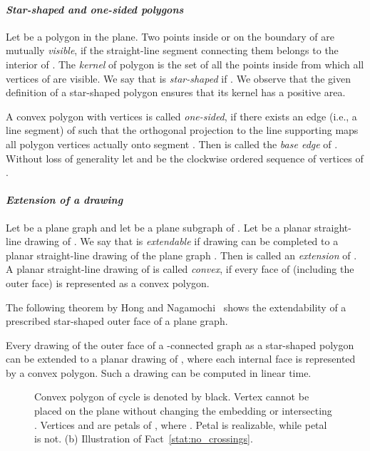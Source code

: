 \documentclass{llncs}
\begin{document}
\paragraph{\emph{\bf Star-shaped and one-sided polygons}}
Let  be a polygon in the plane.  Two points inside or on the boundary of  are mutually \emph{visible}, if the straight-line segment
connecting them belongs to the interior of . The \emph{kernel}  of polygon
 is the set of all the points inside  from which all vertices of
 are visible. We say that  is \emph{star-shaped} if . We observe that the given definition of a star-shaped polygon ensures that its kernel has a positive area.

A convex polygon  with  vertices is called \emph{one-sided}, if there exists an edge  (i.e., a line segment) of  such that the orthogonal projection to the line supporting   maps all polygon vertices actually onto segment . Then  is called the \emph{base edge} of . Without loss of generality let  and   be the clockwise ordered sequence of vertices of .


\paragraph{\emph{\bf Extension of a drawing}}
Let  be a plane graph and let  be a plane subgraph of 
.  Let  be a planar straight-line drawing of . We say that  is 
\emph{extendable} if drawing  can be 
completed to a planar straight-line drawing  of the plane graph . 
Then  is called an \emph{extension} of . 
A planar straight-line drawing of  is called \emph{convex}, if every face of  (including the outer face) is represented as a convex polygon.

The following theorem by Hong and Nagamochi~\cite{HongN08}
shows the extendability of a prescribed star-shaped outer face of a plane graph.
\begin{theorem}
\label{theorem:HongNagamochi} Every drawing  of the outer face 
of a -connected graph  as a star-shaped polygon can be
extended to a planar drawing of , where each internal face is
represented by a convex polygon. Such a drawing can be computed in
linear time.
\end{theorem}
\begin{figure}[tb]
 \centering
 \hspace{+1cm}
 \caption{Convex polygon of cycle  is denoted by black. Vertex  cannot be placed on the plane without changing the embedding or intersecting .  Vertices  and  are petals of , where . Petal  is realizable, while petal  is not. (b) Illustration of Fact~\ref{stat:no_crossings}.}
\end{figure}
\end{document}
